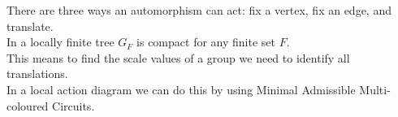 \documentclass[preview]{standalone}
\begin{document}
There are three ways an automorphism can act: fix a vertex, fix an edge, and translate.\\In a locally finite tree $G_F$ is compact for any finite set $F$.\\This means to find the scale values of a group we need to identify all translations.\ \\In a local action diagram we can do this by using Minimal Admissible Multi-coloured Circuits.\\
\end{document}
